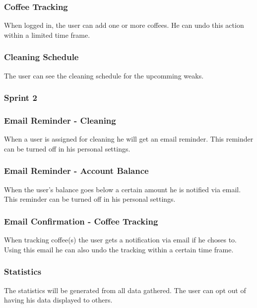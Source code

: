 \subsubsection*{Coffee Tracking}

When logged in, the user can add one or more coffees. He can undo this
action within a limited time frame.

\subsubsection*{Cleaning Schedule}

The user can see the cleaning schedule for the upcomming weaks.

\subsubsection{Sprint 2}\label{sprint-2}

\subsubsection*{Email Reminder - Cleaning}

When a user is assigned for cleaning he will get an email reminder. This
reminder can be turned off in his personal settings.

\subsubsection*{Email Reminder - Account Balance}

When the user's balance goes below a certain amount he is notified via
email. This reminder can be turned off in his personal settings.

\subsubsection*{Email Confirmation - Coffee Tracking}

When tracking coffee(s) the user gets a notification via email if he
choses to. Using this email he can also undo the tracking within a
certain time frame.

\subsubsection*{Statistics}

The statistics will be generated from all data gathered. The user can
opt out of having his data displayed to others.

